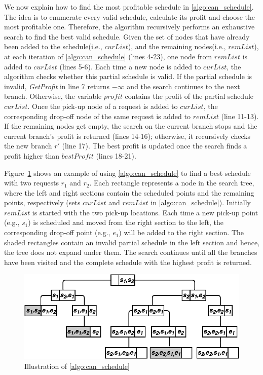 We now explain how to find the most profitable schedule in \cref{algo:can_schedule}. The idea is to enumerate every valid schedule, calculate its profit and choose the most profitable one. Therefore, the algorithm recursively performs an exhaustive search to find the best valid schedule. Given the set of nodes that have already been added to the schedule(i.e., $curList$), and the remaining nodes(i.e., $remList$), at each iteration of \cref{algo:can_schedule} (lines 4-23), one node from $remList$ is added to $curList$ (lines 5-6). Each time a new node is added to $curList$, the algorithm checks whether this partial schedule is valid. If the partial schedule is invalid, \textit{GetProfit} in line 7 returns $-\infty$ and the search continues to the next branch. Otherwise, the variable $profit$ contains the profit of the partial schedule $curList$. Once the pick-up node of a request is added to $curList$, the corresponding drop-off node of the same request is added to $remList$ (line 11-13). If the remaining nodes get empty, the search on the current branch stops and the current branch's profit is returned (lines 14-16); otherwise, it recursively checks the new branch $r'$ (line 17). The best profit is updated once the search finds a profit higher than $bestProfit$ (lines 18-21). 

Figure~\ref{fig:bAndb} shows an example of using \cref{algo:can_schedule} to find a best schedule with two requests $r_1$ and $r_2$. Each rectangle represents a node in the search tree, where the left and right sections contain the scheduled points and the remaining points, respectively (sets $curList$ and $remList$ in \cref{algo:can_schedule}). Initially $remList$ is started with the two pick-up locations. Each time a new pick-up point (e.g., $s_1$) is scheduled and moved from the right section to the left, the corresponding drop-off point (e.g., $e_1$) will be added to the right section. The shaded rectangles contain an invalid partial schedule in the left section and hence, the tree does not expand under them. The search continues until all the branches have been visited and the complete schedule with the highest profit is returned.

\begin{figure}[!ht]
	\centering
	\includegraphics[width=0.75\columnwidth]{fig/bAndb.png}
	\vspace{-0mm}\caption{Illustration of \cref{algo:can_schedule}} \vspace{-2mm} \label{fig:bAndb}
\end{figure}\vspace{-0mm}

